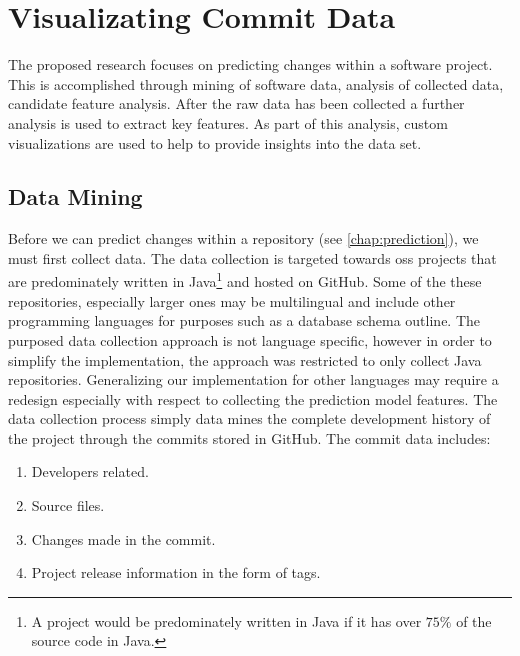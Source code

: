 \chapter{Visualizating Commit Data}
\label{chap:visualization}

The proposed research focuses on predicting changes within a software project. This is accomplished through mining of software data, analysis of collected data, candidate feature analysis. After the raw data has been collected a further analysis is used to extract key features. As part of this analysis, custom visualizations are used to help to provide insights into the data set. %

\section{Data Mining}
\label{sec:data_mining}

Before we can predict changes within a repository (see \autoref{chap:prediction}), we must first collect data. The data collection is targeted towards \gls{oss} projects that are predominately written in Java\footnote{A project would be predominately written in Java if it has over $75\%$ of the source code in Java.} and hosted on GitHub. Some of the these repositories, especially larger ones may be multilingual and include other programming languages for purposes such as a database schema outline. The purposed data collection approach is not language specific, however in order to simplify the implementation, the approach was restricted to only collect Java repositories. Generalizing our implementation for other languages may require a redesign especially with respect to collecting the prediction model features. The data collection process simply data mines the complete development history of the project through the commits stored in GitHub. The commit data includes:
\begin{enumerate}
\item Developers related.
\item Source files.
\item Changes made in the commit.
\item Project release information in the form of tags.
\end{enumerate}


